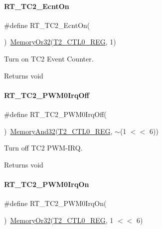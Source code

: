 \paragraph{\texorpdfstring{R\+T\+\_\+\+T\+C2\+\_\+\+Ecnt\+On}{RT\_TC2\_EcntOn}}
{\footnotesize\ttfamily \#define R\+T\+\_\+\+T\+C2\+\_\+\+Ecnt\+On(\begin{DoxyParamCaption}{ }\end{DoxyParamCaption})~\mbox{\hyperlink{a00020_a27874a97deab7cecdde5ddecf466e31e}{Memory\+Or32}}(\mbox{\hyperlink{a00020_a5853553391e986211306d4f29ab31e47}{T2\+\_\+\+C\+T\+L0\+\_\+\+R\+EG}}, 1)}



Turn on T\+C2 Event Counter. 

\begin{DoxyReturn}{Returns}
void 
\end{DoxyReturn}
\mbox{\label{a00047_aa5878518a5c2f7b419de8ed259b54e75}} 
\paragraph{\texorpdfstring{R\+T\+\_\+\+T\+C2\+\_\+\+P\+W\+M0\+Irq\+Off}{RT\_TC2\_PWM0IrqOff}}
{\footnotesize\ttfamily \#define R\+T\+\_\+\+T\+C2\+\_\+\+P\+W\+M0\+Irq\+Off(\begin{DoxyParamCaption}{ }\end{DoxyParamCaption})~\mbox{\hyperlink{a00020_ad87cedffcaadc51db22594fce55173d4}{Memory\+And32}}(\mbox{\hyperlink{a00020_a5853553391e986211306d4f29ab31e47}{T2\+\_\+\+C\+T\+L0\+\_\+\+R\+EG}}, $\sim$(1 $<$$<$ 6))}



Turn off T\+C2 P\+W\+M-\/\+I\+RQ. 

\begin{DoxyReturn}{Returns}
void 
\end{DoxyReturn}
\mbox{\label{a00047_a20ca153421087b763d5a1bcec1f90d55}} 
\paragraph{\texorpdfstring{R\+T\+\_\+\+T\+C2\+\_\+\+P\+W\+M0\+Irq\+On}{RT\_TC2\_PWM0IrqOn}}
{\footnotesize\ttfamily \#define R\+T\+\_\+\+T\+C2\+\_\+\+P\+W\+M0\+Irq\+On(\begin{DoxyParamCaption}{ }\end{DoxyParamCaption})~\mbox{\hyperlink{a00020_a27874a97deab7cecdde5ddecf466e31e}{Memory\+Or32}}(\mbox{\hyperlink{a00020_a5853553391e986211306d4f29ab31e47}{T2\+\_\+\+C\+T\+L0\+\_\+\+R\+EG}}, 1 $<$$<$ 6)}



